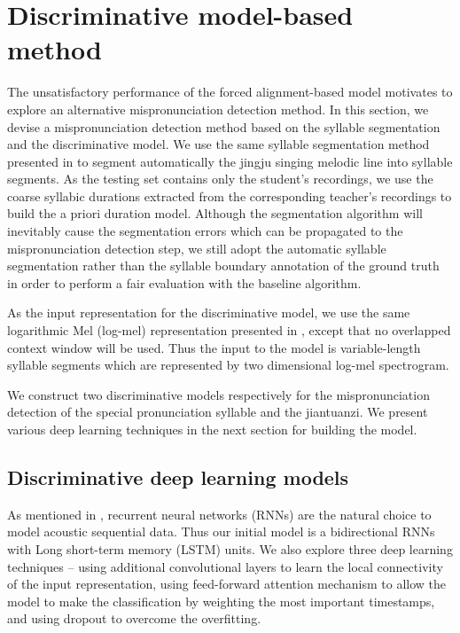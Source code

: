 \section{Discriminative model-based method}\label{sec:ch6:discriminative_model_method}

The unsatisfactory performance of the forced alignment-based model motivates to explore an alternative mispronunciation detection method. In this section, we devise a mispronunciation detection method based on the syllable segmentation and the discriminative model. We use the same syllable segmentation method presented in  to segment automatically the jingju singing melodic line into syllable segments. As the testing set contains only the student's recordings, we use the coarse syllabic durations extracted from the corresponding teacher's recordings to build the a priori duration model. Although the segmentation algorithm will inevitably cause the segmentation errors which can be propagated to the mispronunciation detection step, we still adopt the automatic syllable segmentation rather than the syllable boundary annotation of the ground truth in order to perform a fair evaluation with the baseline algorithm.

As the input representation for the discriminative model, we use the same logarithmic Mel (log-mel) representation presented in , except that no overlapped context window will be used. Thus the input to the model is variable-length syllable segments which are represented by two dimensional log-mel spectrogram. 

We construct two discriminative models respectively for the mispronunciation detection of the special pronunciation syllable and the jiantuanzi. We present various deep learning techniques in the next section for building the model.

\subsection{Discriminative deep learning models}\label{sec:ch6:discriminative_dl_models}

As mentioned in , recurrent neural networks (RNNs) are the natural choice to model acoustic sequential data. Thus our initial model is a bidirectional RNNs with Long short-term memory (LSTM) units. We also explore three deep learning techniques -- using additional convolutional layers to learn the local connectivity of the input representation, using feed-forward attention mechanism to allow the model to make the classification by weighting the most important timestamps, and using dropout to overcome the overfitting.

